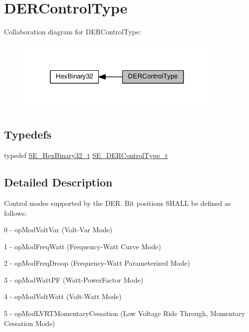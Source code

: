 \hypertarget{group__DERControlType}{}\section{D\+E\+R\+Control\+Type}
\label{group__DERControlType}
Collaboration diagram for D\+E\+R\+Control\+Type\+:\nopagebreak
\begin{figure}[H]
\begin{center}
\leavevmode
\includegraphics[width=281pt]{group__DERControlType}
\end{center}
\end{figure}
\subsection*{Typedefs}
\begin{DoxyCompactItemize}
\item 
typedef \hyperlink{group__HexBinary32_ga062e99a233c4875284116657d048bb98}{S\+E\+\_\+\+Hex\+Binary32\+\_\+t} \hyperlink{group__DERControlType_gae0eefcd49e1cd98d709327c88f20a76b}{S\+E\+\_\+\+D\+E\+R\+Control\+Type\+\_\+t}
\end{DoxyCompactItemize}


\subsection{Detailed Description}
Control modes supported by the D\+ER. Bit positions S\+H\+A\+LL be defined as follows\+:

0 -\/ op\+Mod\+Volt\+Var (Volt-\/\+Var Mode)

1 -\/ op\+Mod\+Freq\+Watt (Frequency-\/\+Watt Curve Mode)

2 -\/ op\+Mod\+Freq\+Droop (Frequency-\/\+Watt Parameterized Mode)

3 -\/ op\+Mod\+Watt\+PF (Watt-\/\+Power\+Factor Mode)

4 -\/ op\+Mod\+Volt\+Watt (Volt-\/\+Watt Mode)

5 -\/ op\+Mod\+L\+V\+R\+T\+Momentary\+Cessation (Low Voltage Ride Through, Momentary Cessation Mode)


